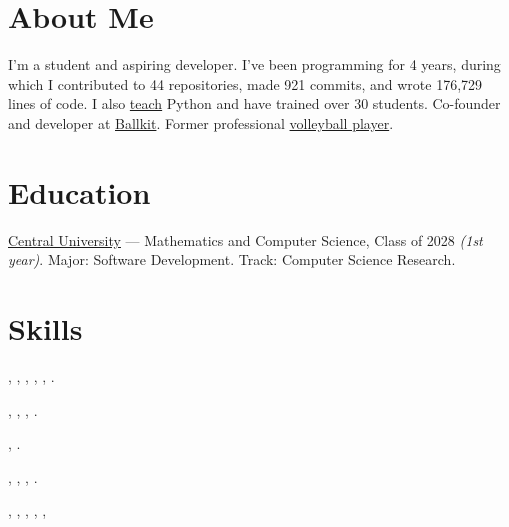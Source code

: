 \documentclass[margin,line]{resume}
\begin{document}
\begin{resume}

  \section{\mysidestyle About Me}
  I'm a student and aspiring developer. I've been programming for 4
  years, during which I contributed to 44 repositories, made 921
  commits, and wrote 176,729 lines of code.
  I also
  \href{https://alchemmist.xyz/teach/individual-education/}{teach}
  Python and have trained over 30 students. Co-founder and developer
  at \href{https://ballkit.ru/}{Ballkit}. Former professional
  \href{https://alchemmist.github.io/CV/attachments/sport.pdf}{volleyball
  player}.

  \section{\mysidestyle Education}
  \href{https://centraluniversity.ru/}{Central University} —
  Mathematics and Computer Science, Class of 2028 \textit{(1st year)}.
  Major: Software Development. Track: Computer Science Research.

  \section{\mysidestyle Skills}

  \vspace{0.4mm}
  \begin{description}[leftmargin=0pt, itemindent=*, itemsep=0.2pt]
    \item[Go:] , ,
      , ,
      , .
    \item[Databases:] , ,
      , .
    \item[Message brokers:] , .
    \item[Other technologies:] , ,
      , .
    \item[Dev tools:] , ,
      , , ,
  \end{description}


\end{resume}
\end{document}
